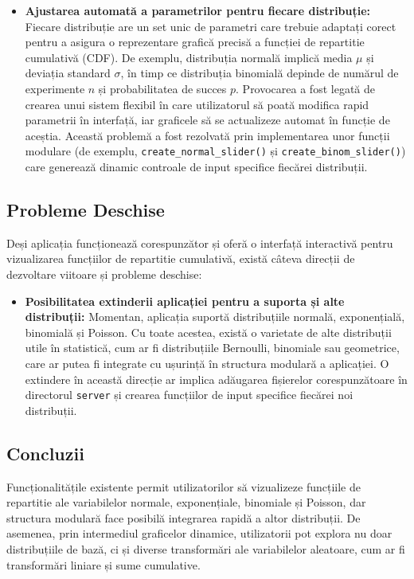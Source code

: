 \documentclass[a4paper,11pt]{article}
\begin{document}
\begin{itemize}
    \item \textbf{Ajustarea automată a parametrilor pentru fiecare distribuție:}  
    Fiecare distribuție are un set unic de parametri care trebuie adaptați corect pentru a asigura o reprezentare grafică precisă a funcției de repartitie cumulativă (CDF). De exemplu, distribuția normală implică media \(\mu\) și deviația standard \(\sigma\), în timp ce distribuția binomială depinde de numărul de experimente \(n\) și probabilitatea de succes \(p\). Provocarea a fost legată de crearea unui sistem flexibil în care utilizatorul să poată modifica rapid parametrii în interfață, iar graficele să se actualizeze automat în funcție de aceștia. Această problemă a fost rezolvată prin implementarea unor funcții modulare (de exemplu, \texttt{create\_normal\_slider()} și \texttt{create\_binom\_slider()}) care generează dinamic controale de input specifice fiecărei distribuții.
\end{itemize}

\subsection*{Probleme Deschise}

Deși aplicația funcționează corespunzător și oferă o interfață interactivă pentru vizualizarea funcțiilor de repartitie cumulativă, există câteva direcții de dezvoltare viitoare și probleme deschise:

\begin{itemize}
    \item \textbf{Posibilitatea extinderii aplicației pentru a suporta și alte distribuții:}  
    Momentan, aplicația suportă distribuțiile normală, exponențială, binomială și Poisson. Cu toate acestea, există o varietate de alte distribuții utile în statistică, cum ar fi distribuțiile Bernoulli, binomiale sau geometrice, care ar putea fi integrate cu ușurință în structura modulară a aplicației. O extindere în această direcție ar implica adăugarea fișierelor corespunzătoare în directorul \texttt{server} și crearea funcțiilor de input specifice fiecărei noi distribuții.
\end{itemize}

\subsection*{Concluzii}

Funcționalitățile existente permit utilizatorilor să vizualizeze funcțiile de repartitie ale variabilelor normale, exponențiale, binomiale și Poisson, dar structura modulară face posibilă integrarea rapidă a altor distribuții. De asemenea, prin intermediul graficelor dinamice, utilizatorii pot explora nu doar distribuțiile de bază, ci și diverse transformări ale variabilelor aleatoare, cum ar fi transformări liniare și sume cumulative.
\end{document}
